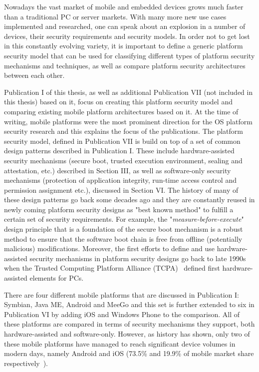 \begin{quoting}
\end{quoting}

Nowadays the vast market of mobile and embedded devices grows much faster than a traditional PC or server markets. With many more new use cases implemented and researched, one can speak about an explosion in a number of devices, their security requirements and security models. In order not to get lost in this constantly evolving variety, it is important to define a generic platform security model that can be used for classifying different types of platform security mechanisms and techniques, as well as compare platform security architectures between each other. 

Publication I of this thesis, as well as additional Publication VII (not included in this thesis) based on it, focus on creating this platform security model and comparing existing mobile platform architectures based on it. At the time of writing, mobile platforms were the most prominent direction for the OS platform security research and this explains the focus of the publications. The platform security model, defined in Publication VII is build on top of a set of common design patterns described in Publication I. These include hardware-assisted security mechanisms (secure boot, trusted execution environment, sealing and attestation, etc.) described in Section III, as well as software-only security mechanisms (protection of application integrity, run-time access control and permission assignment etc.), discussed in Section VI. The history of many of these design patterns go back some decades ago and they are constantly reused in newly coming platform security designs as "best known method" to fulfill a certain set of security requirements. For example, the "\textit{measure-before-execute}" design principle that is a foundation of the secure boot mechanism is a robust method to ensure that the software boot chain is free from offline (potentially malicious) modifications. Moreover, the first efforts to define and use hardware-assisted security mechanisms in platform security designs go back to late 1990s when the Trusted Computing Platform Alliance (TCPA)~\cite{pearson2002} defined first hardware-assisted elements for PCs.

There are four different mobile platforms that are discussed in Publication I: Symbian, Java ME, Android and MeeGo and this set is further extended to six in Publication VI by adding iOS and Windows Phone to the comparison. All of these platforms are compared in terms of security mechanisms they support, both hardware-assisted and software-only. However, as history has shown, only two of these mobile platforms have managed to reach significant device volumes in modern days, namely Android and iOS (73.5\% and 19.9\% of mobile market share respectively~\cite{osshare}).  

